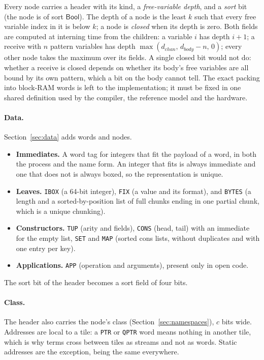 \documentclass[10.5pt,a4paper]{extarticle}
\newcommand{\kw}[1]{\texttt{#1}}
\theoremstyle{definition}
\theoremstyle{remark}
\begin{document}
\medskip\noindent
Every node carries a header with its kind, a \emph{free-variable depth}, and
a \emph{sort} bit (the node is of sort $\mathsf{Bool}$). The depth of a node
is the least $k$ such that every free variable index in it is below $k$; a
node is \emph{closed} when its depth is zero. Both fields are computed at
interning time from the children: a variable $i$ has depth $i+1$; a receive
with $n$ pattern variables has depth $\max(d_{\mathit{chan}},\, d_{\mathit{body}}-n,\, 0)$;
every other node takes the maximum over its fields. A single closed bit would
not do: whether a receive is closed depends on whether its body's free
variables are all bound by its own pattern, which a bit on the body cannot
tell. The exact packing into block-RAM words is left to the
implementation; it must be fixed in one shared definition used by the
compiler, the reference model and the hardware.

\paragraph{Data.} Section~\ref{sec:data} adds words and nodes.
\begin{itemize}
\item \textbf{Immediates.} A word tag for integers that fit the payload of a
word, in both the process and the name form. An integer that fits is always
immediate and one that does not is always boxed, so the representation is
unique.
\item \textbf{Leaves.} \kw{IBOX} (a 64-bit integer), \kw{FIX} (a value and
its format), and \kw{BYTES} (a length and a sorted-by-position list of full
chunks ending in one partial chunk, which is a unique chunking).
\item \textbf{Constructors.} \kw{TUP} (arity and fields), \kw{CONS} (head,
tail) with an immediate for the empty list, \kw{SET} and \kw{MAP} (sorted
cons lists, without duplicates and with one entry per key).
\item \textbf{Applications.} \kw{APP} (operation and arguments), present only
in open code.
\end{itemize}
The sort bit of the header becomes a sort field of four bits.

\paragraph{Class.} The header also carries the node's class
(Section~\ref{sec:namespaces}), $c$ bits wide. Addresses are local to a tile:
a \kw{PTR} or \kw{QPTR} word means nothing in another tile, which is why
terms cross between tiles as streams and not as words. Static addresses are
the exception, being the same everywhere.
\end{document}
